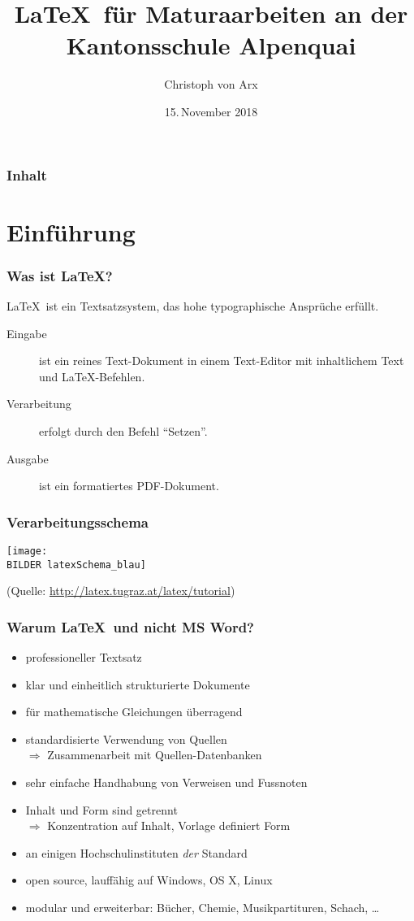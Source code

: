 \documentclass[11pt,german]{beamer}
\title{ \LaTeX\ für Maturaarbeiten an der \\Kantonsschule Alpenquai\\
}
\author{Christoph von Arx}
\date{15.\,November 2018}
\def\BILDER{../Bilder/} %
\begin{document}
\frame{\titlepage}   %

\begin{frame}
\frametitle{Inhalt}  %
\tableofcontents
\end{frame}

\section{Einführung} %
\frame
{
	\frametitle{Was ist \LaTeX ?}
	\LaTeX\ ist ein Textsatzsystem, das hohe typographische Ansprüche erfüllt.

\begin{center}
		\parbox[c]{0.98\textwidth}
		{\begin{description}
	\item[Eingabe]ist ein reines Text-Dokument in einem Text-Editor mit inhaltlichem Text und \LaTeX-Befehlen.
	\item[Verarbeitung]erfolgt durch den Befehl \enquote{Setzen}.
	\item[Ausgabe]ist ein formatiertes PDF-Dokument.
\end{description}
}
\end{center}
}

\frame
{
	\frametitle{Verarbeitungsschema}
	 	\begin{center}
	 \texttt{[image: \\BILDER latexSchema\_blau]}
	 	\end{center}
		\vfill
{\tiny (Quelle: \url{http://latex.tugraz.at/latex/tutorial})}
}


\frame
{
  \frametitle{Warum \LaTeX\ und nicht MS Word?}
\begin{itemize}
	\item professioneller Textsatz
	\item klar und einheitlich strukturierte Dokumente
	\item für mathematische Gleichungen überragend
	\item standardisierte Verwendung von Quellen  \\$ \Rightarrow$ Zusammenarbeit mit Quellen-Datenbanken
	\item sehr einfache Handhabung von Verweisen und Fussnoten
	\item Inhalt und Form sind getrennt \\$ \Rightarrow$ Konzentration auf Inhalt, Vorlage definiert Form
	\item an einigen Hochschulinstituten \emph{der} Standard
	\item open source, lauffähig auf Windows, OS X, Linux
	\item modular und erweiterbar: Bücher, Chemie, Musikpartituren, Schach, \dots
\end{itemize}
}
\end{document}
